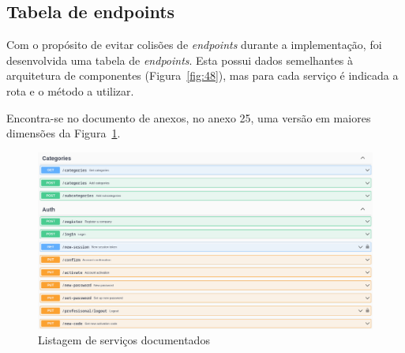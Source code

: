 \newpage

\subsection{Tabela de endpoints}
Com o propósito de evitar colisões de \textit{endpoints} durante a implementação, foi desenvolvida uma tabela de \textit{endpoints}. Esta possui dados semelhantes à arquitetura de componentes (Figura~\ref*{fig:48}), mas para cada serviço é indicada a rota e o método a utilizar.

Encontra-se no documento de anexos, no anexo 25, uma versão em maiores dimensões da Figura~\ref*{docs_swagger}.



\begin{figure}[htb]
  \centering
  \includegraphics[width=\textwidth]{images/implementacao/api/swagger_intro.png}
  \caption{Listagem de serviços documentados}
  \label{docs_swagger}
\end{figure}

\newpage
